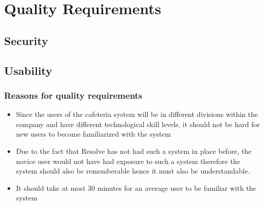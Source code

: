 \documentclass[12pt]{article}
\begin{document}
\section{Quality Requirements}

\subsection{Security}

\subsection{Usability}
 \subsubsection{Reasons for quality requirements}
 \begin{itemize}
 \item Since the users of the cafeteria system will be in different divisions within the company and have different technological skill levels, it should not be hard for new users to become familiarized with the system
 \item Due to the fact that Resolve has not had such a system in place before, the novice user would not have had exposure to such a system therefore the system should also be rememberable hence it must also be understandable. 
	\item It should take at most 30 minutes for an average user to be familiar with the system
 \end{itemize}
\end{document}
